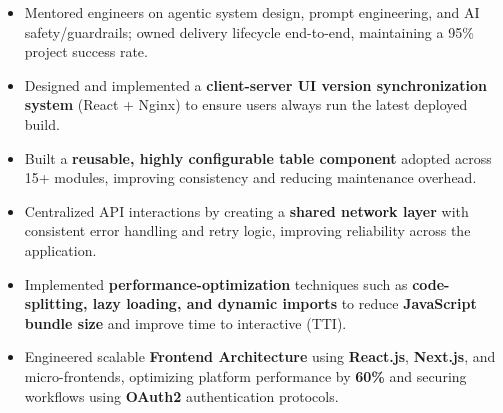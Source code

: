 \documentclass[a4paper]{article}
\begin{document}
\begin{itemize}
\item {Mentored engineers on agentic system design, prompt engineering, and AI safety/guardrails; owned delivery lifecycle end-to-end, maintaining a 95\% project success rate.}
\item  {Designed and implemented a \textbf{client-server UI version synchronization system} (React + Nginx) to ensure users always run the latest deployed build.}
\item  {Built a \textbf{reusable, highly configurable table component} adopted across 15+ modules, improving consistency and reducing maintenance overhead.}
\item  {Centralized API interactions by creating a \textbf{shared network layer} with consistent error handling and retry logic, improving reliability across the application.}
\item {Implemented \textbf{performance-optimization} techniques such as \textbf{code-splitting, lazy loading, and dynamic imports} to reduce \textbf{JavaScript bundle size} and improve time to interactive (TTI).}
\item {Engineered scalable \textbf{Frontend Architecture} using \textbf{React.js}, \textbf{Next.js}, and micro-frontends, optimizing platform performance by \textbf{60\%} and securing workflows using \textbf{OAuth2} authentication protocols.}
\end{itemize}
\end{document}
